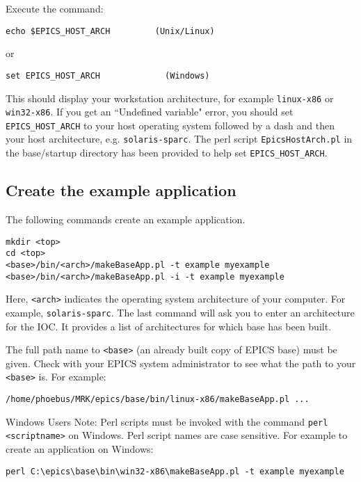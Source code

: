 Execute the command:

\begin{verbatim}
echo $EPICS_HOST_ARCH         (Unix/Linux)
\end{verbatim}
or
\begin{verbatim}
set EPICS_HOST_ARCH             (Windows)
\end{verbatim}

This should display your workstation architecture, for example \verb|linux-x86| or \verb|win32-x86|. If you get an ``Undefined 
variable" error, you should set \verb|EPICS_HOST_ARCH| to your host operating system followed by a dash and then your host 
architecture, e.g.  \verb|solaris-sparc|. The perl script \verb|EpicsHostArch.pl| in the base/startup directory has been provided to help 
set \verb|EPICS_HOST_ARCH|.

\subsection{Create the example application}

The following commands create an example application.

\begin{verbatim}
mkdir <top>
cd <top>
<base>/bin/<arch>/makeBaseApp.pl -t example myexample
<base>/bin/<arch>/makeBaseApp.pl -i -t example myexample
\end{verbatim}

Here, \verb|<arch>| indicates the operating system architecture of your computer.  For example, \verb|solaris-sparc|. The last command 
will ask you to enter an architecture for the IOC. It provides a list of architectures for which base has been built.

The full path name to \verb|<base>| (an already built copy of EPICS base) must be given. Check with your EPICS system 
administrator to see what the path to your \verb|<base>| is. For example:

\begin{verbatim}
/home/phoebus/MRK/epics/base/bin/linux-x86/makeBaseApp.pl ...
\end{verbatim}

Windows Users Note: Perl scripts must be invoked with the command \verb|perl <scriptname>| on Windows. Perl script names are 
case sensitive. For example to create an application on Windows:

\begin{verbatim}
perl C:\epics\base\bin\win32-x86\makeBaseApp.pl -t example myexample
\end{verbatim}


